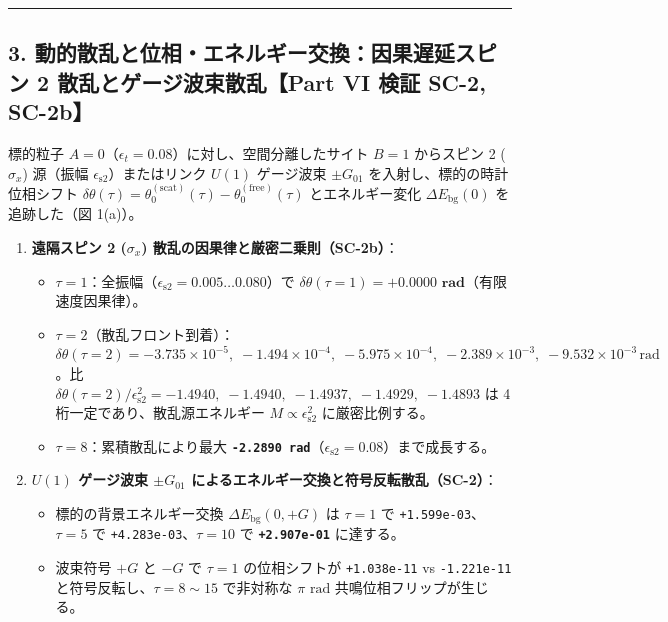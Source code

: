 \documentclass[
  a4paper,
]{ltjsarticle}
\providecommand{\tightlist}{%
  \setlength{\itemsep}{0pt}\setlength{\parskip}{0pt}}
\begin{document}
\begin{center}\rule{0.5\linewidth}{0.5pt}\end{center}

\subsection{3. 動的散乱と位相・エネルギー交換：因果遅延スピン 2
散乱とゲージ波束散乱【Part VI 検証 SC-2,
SC-2b】}\label{ux52d5ux7684ux6563ux4e71ux3068ux4f4dux76f8ux30a8ux30cdux30ebux30aeux30fcux4ea4ux63dbux56e0ux679cux9045ux5ef6ux30b9ux30d4ux30f3-2-ux6563ux4e71ux3068ux30b2ux30fcux30b8ux6ce2ux675fux6563ux4e71part-vi-ux691cux8a3c-sc-2-sc-2b}

標的粒子 \(A=0\)（\(\epsilon_t = 0.08\)）に対し、空間分離したサイト
\(B=1\) からスピン 2 (\(\sigma_x\)) 源（振幅
\(\epsilon_{\mathrm{s2}}\)）またはリンク \(U(1)\) ゲージ波束
\(\pm G_{01}\) を入射し、標的の時計位相シフト
\(\delta\theta(\tau) = \theta_0^{(\mathrm{scat})}(\tau) - \theta_0^{(\mathrm{free})}(\tau)\)
とエネルギー変化 \(\Delta E_{\mathrm{bg}}(0)\) を追跡した（図 1(a)）。

\begin{enumerate}
\def\labelenumi{\arabic{enumi}.}
\tightlist
\item
  \textbf{遠隔スピン 2 (\(\sigma_x\))
  散乱の因果律と厳密二乗則（SC-2b）}：

  \begin{itemize}
  \tightlist
  \item
    \(\tau = 1\)：全振幅（\(\epsilon_{\mathrm{s2}} = 0.005 \dots 0.080\)）で
    \textbf{\(\delta\theta(\tau=1) = \mathbf{+0.0000\text{ rad}}\)}（有限速度因果律）。
  \item
    \(\tau = 2\)（散乱フロント到着）：\(\delta\theta(\tau=2) = -3.735\times 10^{-5},\; -1.494\times 10^{-4},\; -5.975\times 10^{-4},\; -2.389\times 10^{-3},\; -9.532\times 10^{-3}\,\mathrm{rad}\)。比
    \textbf{\(\delta\theta(\tau=2)/\epsilon_{\mathrm{s2}}^2 = \mathbf{-1.4940,\; -1.4940,\; -1.4937,\; -1.4929,\; -1.4893}\)}
    は 4 桁一定であり、散乱源エネルギー
    \(M \propto \epsilon_{\mathrm{s2}}^2\) に厳密比例する。
  \item
    \(\tau = 8\)：累積散乱により最大
    \textbf{\texttt{-2.2890\ rad}}（\(\epsilon_{\mathrm{s2}} = 0.08\)）まで成長する。
  \end{itemize}
\item
  \textbf{\(U(1)\) ゲージ波束 \(\pm G_{01}\)
  によるエネルギー交換と符号反転散乱（SC-2）}：

  \begin{itemize}
  \tightlist
  \item
    標的の背景エネルギー交換 \(\Delta E_{\mathrm{bg}}(0, +G)\) は
    \(\tau = 1\) で \texttt{+1.599e-03}、\(\tau = 5\) で
    \texttt{+4.283e-03}、\(\tau = 10\) で \textbf{\texttt{+2.907e-01}}
    に達する。
  \item
    波束符号 \(+G\) と \(-G\) で \(\tau = 1\) の位相シフトが
    \texttt{+1.038e-11} vs \texttt{-1.221e-11}
    と符号反転し、\(\tau = 8 \sim 15\) で非対称な \(\pi\text{ rad}\)
    共鳴位相フリップが生じる。
  \end{itemize}
\end{enumerate}
\end{document}
